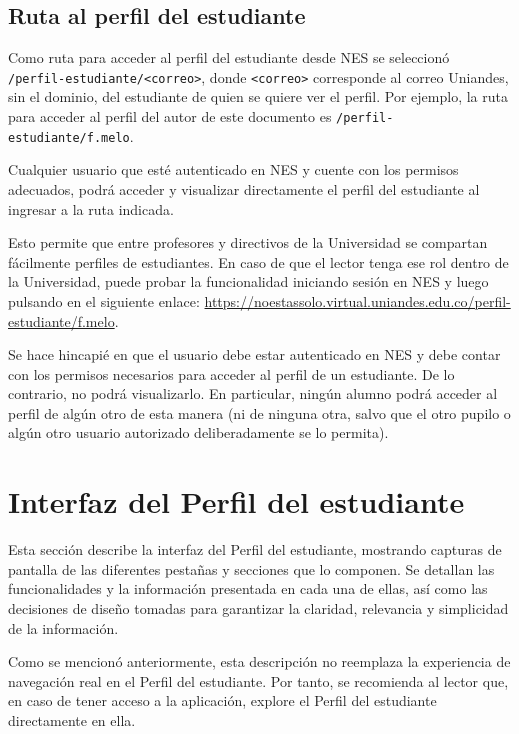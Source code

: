 \subsection{Ruta al perfil del estudiante}
\label{sec:ruta_perfil_estudiante}

Como ruta para acceder al perfil del estudiante desde \gls{NES} se seleccionó \\\texttt{/perfil-estudiante/<correo>}, donde \texttt{<correo>} corresponde al correo Uniandes, sin el dominio, del estudiante de quien se quiere ver el perfil. Por ejemplo, la ruta para acceder al perfil del autor de este documento es \texttt{/perfil-estudiante/f.melo}.

Cualquier usuario que esté autenticado en \gls{NES} y cuente con los permisos adecuados, podrá acceder y visualizar directamente el perfil del estudiante al ingresar a la ruta indicada.

Esto permite que entre profesores y directivos de la Universidad se compartan fácilmente perfiles de estudiantes. En caso de que el lector tenga ese rol dentro de la Universidad, puede probar la funcionalidad iniciando sesión en \gls{NES} y luego pulsando en el siguiente enlace: \url{https://noestassolo.virtual.uniandes.edu.co/perfil-estudiante/f.melo}.

Se hace hincapié en que el usuario debe estar autenticado en \gls{NES} y debe contar con los permisos necesarios para acceder al perfil de un estudiante. De lo contrario, no podrá visualizarlo. En particular, ningún alumno podrá acceder al perfil de algún otro de esta manera (ni de ninguna otra, salvo que el otro pupilo o algún otro usuario autorizado deliberadamente se lo permita).

\section{Interfaz del Perfil del estudiante}

Esta sección describe la interfaz del Perfil del estudiante, mostrando capturas de pantalla de las diferentes pestañas y secciones que lo componen. Se detallan las funcionalidades y la información presentada en cada una de ellas, así como las decisiones de diseño tomadas para garantizar la claridad, relevancia y simplicidad de la información.

Como se mencionó anteriormente, esta descripción no reemplaza la experiencia de navegación real en el Perfil del estudiante. Por tanto, se recomienda al lector que, en caso de tener acceso a la aplicación, explore el Perfil del estudiante directamente en ella.

